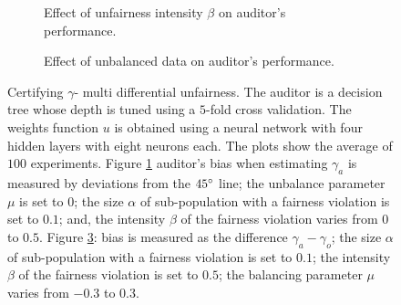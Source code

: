 \documentclass{article}
\begin{document}
\begin{figure}[h!]
\begin{subfigure} {.475\linewidth}
\centering
{}
\caption{Effect of unfairness intensity $\beta$ on auditor's performance.}
\label{fig: 1a}
\end{subfigure}
 \hfill%
\begin{subfigure} {.475\linewidth}
\centering
{}
\caption{Effect of unbalanced data on auditor's performance.}
\label{fig: 1b}
\end{subfigure}
\caption{Certifying $\gamma$- multi differential unfairness. The auditor is a decision tree whose depth is tuned using a $5$-fold cross validation.  The weights function $u$ is obtained using a neural network with four hidden layers with eight neurons each. The plots show the average of $100$ experiments. Figure \ref{fig: 1a} auditor's bias when estimating $\gamma_{a}$ is measured by deviations from the $45\degree$ line; the unbalance parameter $\mu$ is set to $0$; the size $\alpha$ of sub-population with a fairness violation is set to $0.1$; and, the intensity $\beta$ of the fairness violation varies from $0$ to $0.5$. Figure \ref{fig: 1b}: bias is measured as the difference $\gamma_{a}-\gamma_{o}$; the size $\alpha$ of sub-population with a fairness violation is set to $0.1$; the intensity $\beta$ of the fairness violation is set to $0.5$; the balancing parameter $\mu$ varies from $-0.3$ to $0.3$.  } 
\end{figure}
\end{document}
